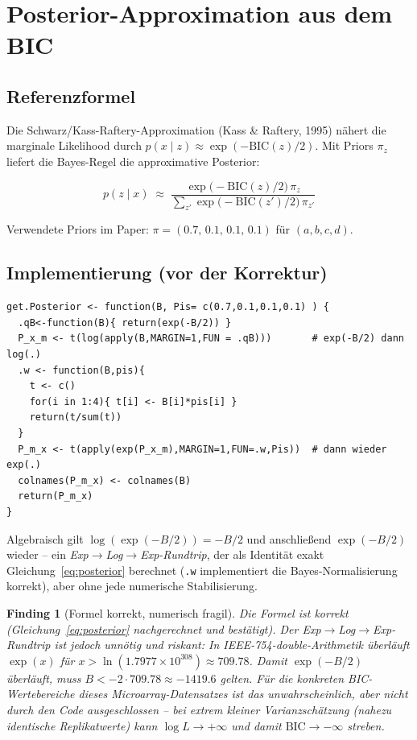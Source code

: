 \documentclass[11pt,a4paper]{article}
\newtheorem{finding}{Finding}
\begin{document}
\section{Posterior-Approximation aus dem BIC}
\label{sec:posterior}

\subsection{Referenzformel}

Die Schwarz/Kass-Raftery-Approximation (Kass \& Raftery, 1995) nähert die
marginale Likelihood durch $p(x\mid z) \approx \exp(-\text{BIC}(z)/2)$. Mit
Priors $\pi_z$ liefert die Bayes-Regel die approximative Posterior:

\begin{equation}
p(z\mid x) \;\approx\;
\frac{\exp\!\big(-\text{BIC}(z)/2\big)\,\pi_z}
     {\displaystyle\sum_{z'}\exp\!\big(-\text{BIC}(z')/2\big)\,\pi_{z'}}
\label{eq:posterior}
\end{equation}

Verwendete Priors im Paper: $\pi = (0.7,\,0.1,\,0.1,\,0.1)$ für $(a,b,c,d)$.

\subsection{Implementierung (vor der Korrektur)}

\begin{lstlisting}
get.Posterior <- function(B, Pis= c(0.7,0.1,0.1,0.1) ) {
  .qB<-function(B){ return(exp(-B/2)) }
  P_x_m <- t(log(apply(B,MARGIN=1,FUN = .qB)))       # exp(-B/2) dann log(.)
  .w <- function(B,pis){
    t <- c()
    for(i in 1:4){ t[i] <- B[i]*pis[i] }
    return(t/sum(t))
  }
  P_m_x <- t(apply(exp(P_x_m),MARGIN=1,FUN=.w,Pis))  # dann wieder exp(.)
  colnames(P_m_x) <- colnames(B)
  return(P_m_x)
}
\end{lstlisting}

Algebraisch gilt $\log(\exp(-B/2)) = -B/2$ und anschließend
$\exp(-B/2)$ wieder -- ein \emph{Exp$\to$Log$\to$Exp-Rundtrip}, der als
Identität exakt Gleichung~\eqref{eq:posterior} berechnet
(\texttt{.w} implementiert die Bayes-Normalisierung korrekt), aber ohne jede
numerische Stabilisierung.

\begin{finding}[Formel korrekt, numerisch fragil]
\label{find:posterior-numeric}
Die \emph{Formel} ist korrekt (Gleichung~\eqref{eq:posterior} nachgerechnet
und bestätigt). Der Exp$\to$Log$\to$Exp-Rundtrip ist jedoch unnötig und
riskant: In IEEE-754-double-Arithmetik überläuft $\exp(x)$ für
$x > \ln(1.7977\times10^{308}) \approx 709.78$. Damit $\exp(-B/2)$
überläuft, muss $B < -2\cdot709.78 \approx -1419.6$ gelten. Für die
konkreten BIC-Wertebereiche dieses Microarray-Datensatzes ist das
unwahrscheinlich, aber nicht durch den Code ausgeschlossen -- bei extrem
kleiner Varianzschätzung (nahezu identische Replikatwerte) kann
$\log L \to +\infty$ und damit $\text{BIC}\to-\infty$ streben.
\end{finding}
\end{document}
